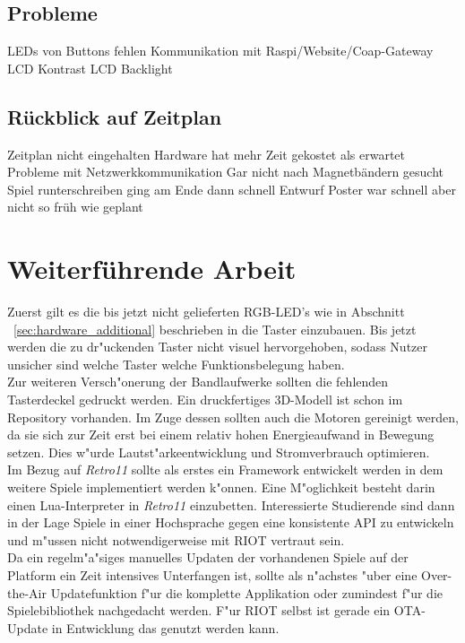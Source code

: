 \documentclass[a4paper]{article}
\begin{document}
  \subsection{Probleme}
  LEDs von Buttons fehlen
  Kommunikation mit Raspi/Website/Coap-Gateway
  LCD Kontrast
  LCD Backlight
  \subsection{Rückblick auf Zeitplan}
  Zeitplan nicht eingehalten
  Hardware hat mehr Zeit gekostet als erwartet
  Probleme mit Netzwerkkommunikation
  Gar nicht nach Magnetbändern gesucht
  Spiel runterschreiben ging am Ende dann schnell
  Entwurf Poster war schnell aber nicht so früh wie geplant

\section{Weiterführende Arbeit}
  \label{sec:further}
  Zuerst gilt es die bis jetzt nicht gelieferten RGB-LED's wie in Abschnitt
  ~\ref{sec:hardware_additional} beschrieben in die Taster einzubauen. Bis
  jetzt werden die zu dr"uckenden Taster nicht visuel hervorgehoben, sodass
  Nutzer unsicher sind welche Taster welche Funktionsbelegung haben.\\
  Zur weiteren Versch"onerung der Bandlaufwerke sollten die fehlenden
  Tasterdeckel gedruckt werden. Ein druckfertiges 3D-Modell ist schon im
  Repository vorhanden. Im Zuge dessen sollten auch die Motoren gereinigt
  werden, da sie sich zur Zeit erst bei einem relativ hohen Energieaufwand in
  Bewegung setzen. Dies w"urde Lautst"arkeentwicklung und Stromverbrauch
  optimieren.\\
  Im Bezug auf \textit{Retro11} sollte als erstes ein Framework entwickelt
  werden in dem weitere Spiele implementiert werden k"onnen.
  Eine M"oglichkeit besteht darin einen Lua-Interpreter in \textit{Retro11}
  einzubetten. Interessierte Studierende sind dann in der Lage Spiele in einer
  Hochsprache gegen eine konsistente API zu entwickeln und m"ussen nicht
  notwendigerweise mit RIOT vertraut sein.\\
  Da ein regelm"a"siges manuelles Updaten der vorhandenen Spiele auf der
  Platform ein Zeit intensives Unterfangen ist, sollte als n"achstes "uber eine
  Over-the-Air Updatefunktion f"ur die komplette Applikation oder zumindest
  f"ur die Spielebibliothek nachgedacht werden. F"ur RIOT selbst ist gerade ein
  OTA-Update in Entwicklung das genutzt werden kann.\\\\
\end{document}
